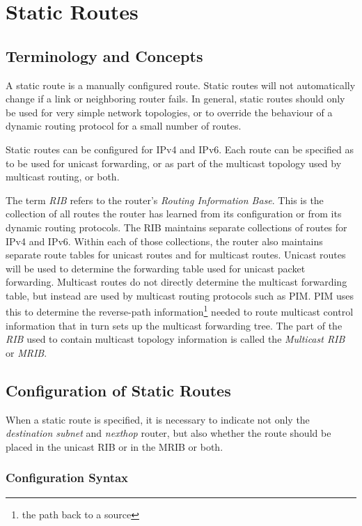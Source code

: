 \chapter{Static Routes}
\label{static_routes}
\section{Terminology and Concepts}

A static route is a manually configured route.  Static routes will not
automatically change if a link or neighboring router fails.  In
general, static routes should only be used for very simple network
topologies, or to override the behaviour of a dynamic routing protocol
for a small number of routes.

Static routes can be configured for IPv4 and IPv6.  Each route can be
specified as to be used for unicast forwarding, or as part of the
multicast topology used by multicast routing, or both.  

The term {\it RIB} refers to the router's {\it Routing Information
Base}.  This is the collection of all routes the router has learned
from its configuration or from its dynamic routing protocols.  The RIB
maintains separate collections of routes for IPv4 and IPv6.  Within
each of those collections, the router also maintains separate route
tables for unicast routes and for multicast routes.  Unicast routes
will be used to determine the forwarding table used for unicast packet
forwarding.  Multicast routes do not directly determine the multicast
forwarding table, but instead are used by multicast routing protocols
such as PIM.  PIM uses this to determine the reverse-path
information\footnote{the path back to a source} needed to route
multicast control information that in turn sets up the multicast
forwarding tree.  The part of the {\it RIB} used to contain multicast
topology information is called the {\it Multicast RIB} or {\it MRIB}.

\newpage
\section{Configuration of Static Routes}

When a static route is specified, it is necessary to indicate not only
the {\it destination subnet} and {\it nexthop} router, but also
whether the route should be placed in the unicast RIB or in the MRIB
or both.

\subsection{Configuration Syntax}

